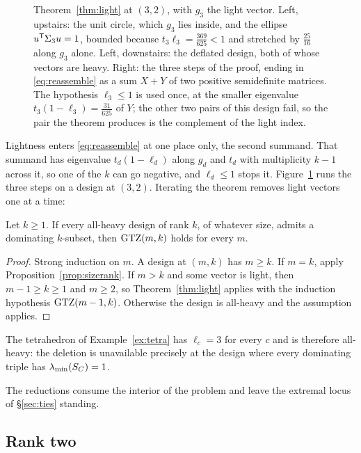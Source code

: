 \begin{figure}[ht]
  \centering
  
  \caption{Theorem~\ref{thm:light} at $(3,2)$, with $g_3$ the light vector.
  Left, upstairs: the unit circle, which $g_3$ lies inside, and the ellipse
  $u^{\mathsf{T}}\Sigma_3u=1$, bounded because $t_3\ell_3=\tfrac{369}{625}<1$ and
  stretched by $\tfrac{25}{16}$ along $g_3$ alone.  Left, downstairs: the
  deflated design, both of whose vectors are heavy.  Right: the three steps
  of the proof, ending in \eqref{eq:reassemble} as a sum $X+Y$ of two
  positive semidefinite matrices.  The hypothesis $\ell_3\le1$ is used once,
  at the smaller eigenvalue $t_3(1-\ell_3)=\tfrac{31}{625}$ of $Y$; the other
  two pairs of this design fail, so the pair the theorem produces is the
  complement of the light index.}
  \label{fig:lightdelete}
\end{figure}

Lightness enters \eqref{eq:reassemble} at one place only, the second
summand.  That summand has eigenvalue $t_d(1-\ell_d)$ along $g_d$ and $t_d$
with multiplicity $k-1$ across it, so one of the $k$ can go negative, and
$\ell_d\le1$ stops it.  Figure~\ref{fig:lightdelete} runs the three
steps on a design at $(3,2)$.  Iterating the theorem removes light
vectors one at a time:

\begin{corollary}[Lean]\label{cor:heavy}
Let $k\ge1$.  If every all-heavy design of rank $k$, of whatever size,
admits a dominating $k$-subset, then $\mathrm{GTZ}(m,k)$ holds for every $m$.
\end{corollary}

\begin{proof}
Strong induction on $m$.  A design at $(m,k)$ has $m\ge k$.  If $m=k$,
apply Proposition~\ref{prop:sizerank}.  If $m>k$ and some vector is light,
then $m-1\ge k\ge1$ and $m\ge2$, so Theorem~\ref{thm:light} applies with
the induction hypothesis $\mathrm{GTZ}(m-1,k)$.  Otherwise the design is
all-heavy and the assumption applies.
\end{proof}

The tetrahedron of Example~\ref{ex:tetra} has $\ell_c=3$ for every $c$ and
is therefore all-heavy: the deletion is unavailable precisely at the
design where every dominating triple has $\lambda_{\min}(S_{C})=1$.

The reductions consume the interior of the problem and leave the extremal
locus of \S\ref{sec:ties} standing.

\subsection{Rank two}\label{sec:ranktwo}

